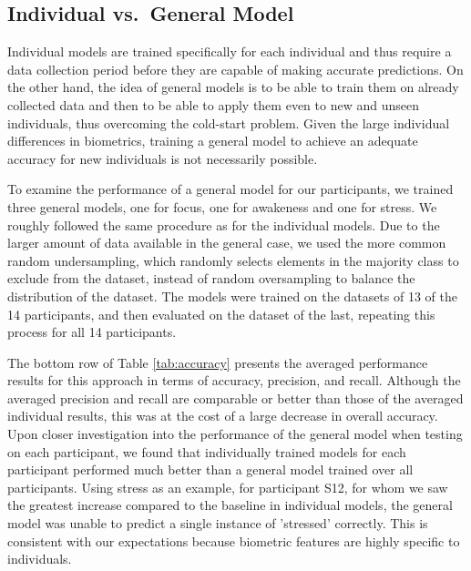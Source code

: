 \subsection{Individual vs.\ General Model}
Individual models are trained specifically for each individual and thus require a data collection period before they are capable of making accurate predictions. On the other hand, the idea of general models is to be able to train them on already collected data and then  to be able to apply them even to new and unseen individuals, thus overcoming the cold-start problem. Given the large individual differences in biometrics, training a general model to achieve an adequate accuracy for new individuals is not necessarily possible. 

To examine the performance of a general model for our participants, we trained three general models, one for focus, one for awakeness and one for stress. We roughly followed the same procedure as for the individual models. Due to the larger amount of data available in the general case, we used the more common random undersampling, which randomly selects elements in the majority class to exclude from the dataset, instead of random oversampling to balance the distribution of the dataset. The models were trained on the datasets of 13 of the 14 participants, and then evaluated on the dataset of the last, repeating this process for all 14 participants. 

The bottom row of Table \ref{tab:accuracy} presents the averaged performance results for this approach in terms of accuracy, precision, and recall. Although the averaged precision and recall are comparable or better than those of the averaged individual results, this was at the cost of a large decrease in overall accuracy. Upon closer investigation into the performance of the general model when testing on each participant, we found that individually trained models for each participant performed much better than a general model trained over all participants. Using stress as an example, for participant S12, for whom we saw the greatest increase compared to the baseline in individual models, the general model was unable to predict a single instance of 'stressed' correctly. This is consistent with our expectations because biometric features are highly specific to individuals.



